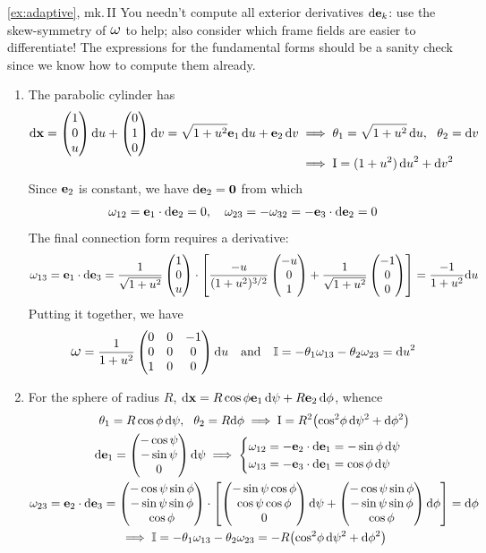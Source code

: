\begin{examples*}{\ref{ex:adaptive}, mk.\,II}{}
	You needn't compute all exterior derivatives $\mathrm{d}{\mathbf{e}}_k$: use the skew-symmetry of $\lomega$ to help; also consider which frame fields are easier to differentiate! The expressions for the fundamental forms should be a sanity check since we know how to compute them already.
	\begin{enumerate}
	  \item The parabolic cylinder has
  	\begin{align*}
  		\dvx=\threevec 10u\du+\threevec 010\dv=\sqrt{1+u^2}\ve_1\,\du+\ve_2\,\dv
  		&\implies \theta_1=\sqrt{1+u^2}\,\du,\ \ \theta_2=\dv\\[-4pt]
  		&\implies \I=(1+u^2)\,\du^2+\dv^2
  	\end{align*}
  	Since ${\mathbf{e}}_2$ is constant, we have $\mathrm{d}{\mathbf{e}}_2=\mathbf{0}$ from which
  	\[
  		\omega_{12}={\mathbf{e}}_1\cdot\mathrm{d}{\mathbf{e}}_2=0,\quad \omega_{23}=-\omega_{32}=-{\mathbf{e}}_3\cdot\mathrm{d}{\mathbf{e}}_2=0
  	\]
  	The final connection form requires a derivative:
  	\[
  		\omega_{13}={\mathbf{e}}_1\cdot\mathrm{d}{\mathbf{e}}_3=\frac 1{\sqrt{1+u^2}}\begin{pmatrix}1\\0\\u\end{pmatrix}\cdot\left[\frac{-u}{(1+u^2)^{3/2}}\begin{pmatrix}-u\\0\\1\end{pmatrix}+\frac 1{\sqrt{1+u^2}}\begin{pmatrix}-1\\0\\0\end{pmatrix}\right] =\frac{-1}{1+u^2}{\mathrm{d} u}
  	\]
  	Putting it together, we have
  	\[
	  	\lomega=\frac{1}{1+u^2}
			\begin{pmatrix}
				0&0&-1\\
				0&0&0\\
				1&0&0
			\end{pmatrix}
			\du	\quad\text{and}\quad 
			\II=-\theta_1\omega_{13}-\theta_2\omega_{23}=\du^2
		\]

	  \item For the sphere of radius $R$, $\mathrm{d}{\mathbf{x}}=R\cos\phi{\mathbf{e}}_1\,\mathrm{d}\psi +R{\mathbf{e}}_2\,\mathrm{d}\phi$, whence
	  \begin{gather*}
		  \theta_1=R\cos\phi\,\mathrm{d}\psi,\ \ \theta_2=R\mathrm{d}\phi \implies \mathrm{I}=R^2\bigl(\cos^2\!\phi\,\mathrm{d}\psi^2+\mathrm{d}\phi^2\bigr)\\
			\mathrm{d}{\mathbf{e}}_1=\begin{pmatrix}-\cos\psi\\-\sin\psi\\0\end{pmatrix}\mathrm{d}\psi\implies 
			\begin{cases}
				\omega_{12}=-{\mathbf{e}}_2\cdot\mathrm{d}{\mathbf{e}}_1=-\sin\phi\,\mathrm{d}\psi\\
				\omega_{13}=-{\mathbf{e}}_3\cdot\mathrm{d}{\mathbf{e}}_1=\cos\phi\,\mathrm{d}\psi
			\end{cases}\\
			\omega_{23} = {\mathbf{e}}_2\cdot\mathrm{d}{\mathbf{e}}_3 = \begin{pmatrix}-\cos\psi\sin\phi\\-\sin\psi\sin\phi\\\cos\phi\end{pmatrix}\cdot\left[\begin{pmatrix}-\sin\psi\cos\phi\\\cos\psi\cos\phi\\0\end{pmatrix}\mathrm{d}\psi + \begin{pmatrix}-\cos\psi\sin\phi\\-\sin\psi\sin\phi\\\cos\phi\end{pmatrix}\mathrm{d}\phi\right] = \mathrm{d}\phi\\
			\implies \mathbb{I} = -\theta_1\omega_{13}-\theta_2\omega_{23} = -R\bigl(\cos^2\!\phi\,\mathrm{d}\psi^2+\mathrm{d}\phi^2\bigr)
	  \end{gather*}
	  

\end{enumerate}
\end{examples*}
